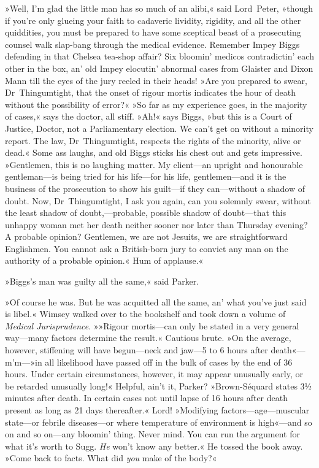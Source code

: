 »Well, I'm glad the little man has so much of an alibi,« said Lord~Peter, »though if you're only glueing your faith to cadaveric lividity, rigidity, and all the other quiddities, you must be prepared to have some sceptical beast of a prosecuting counsel walk slap-bang through the medical evidence. Remember Impey Biggs defending in that Chelsea tea-shop affair? Six bloomin' medicos contradictin' each other in the box, an' old Impey elocutin' abnormal cases from Glaister and Dixon Mann till the eyes of the jury reeled in their heads! »Are you prepared to swear, Dr~Thingumtight, that the onset of rigour mortis indicates the hour of death without the possibility of error?« »So far as my experience goes, in the majority of cases,« says the doctor, all stiff. »Ah!« says Biggs, »but this is a Court of Justice, Doctor, not a Parliamentary election. We can't get on without a minority report. The law, Dr~Thingumtight, respects the rights of the minority, alive or dead.« Some ass laughs, and old Biggs sticks his chest out and gets impressive. »Gentlemen, this is no laughing matter. My client—an upright and honourable gentleman—is being tried for his life—for his life, gentlemen—and it is the business of the prosecution to show his guilt—if they can—without a shadow of doubt. Now, Dr~Thingumtight, I ask you again, can you solemnly swear, without the least shadow of doubt,---probable, possible shadow of doubt—that this unhappy woman met her death neither sooner nor later than Thursday evening? A probable opinion? Gentlemen, we are not Jesuits, we are straightforward Englishmen. You cannot ask a British-born jury to convict any man on the authority of a probable opinion.« Hum of applause.«

»Biggs's man was guilty all the same,« said Parker.

»Of course he was. But he was acquitted all the same, an' what you've just said is libel.« Wimsey walked over to the bookshelf and took down a volume of \textit{Medical Jurisprudence}. »»Rigour mortis—can only be stated in a very general way—many factors determine the result.« Cautious brute. »On the average, however, stiffening will have begun—neck and jaw—5 to 6 hours after death«---m'm---»in all likelihood have passed off in the bulk of cases by the end of 36 hours. Under certain circumstances, however, it may appear unusually early, or be retarded unusually long!« Helpful, ain't it, Parker? »Brown-Séquard states \textellipsis 3½ minutes after death\textellipsis . In certain cases not until lapse of 16 hours after death \textellipsis present as long as 21 days thereafter.« Lord! »Modifying factors—age—muscular state—or febrile diseases—or where temperature of environment is high«---and so on and so on—any bloomin' thing. Never mind. You can run the argument for what it's worth to Sugg. \textit{He} won't know any better.« He tossed the book away. »Come back to facts. What did \textit{you} make of the body?«

